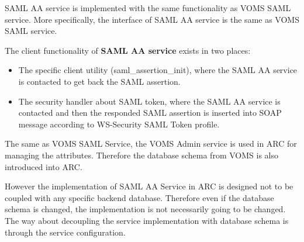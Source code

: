 \documentclass{article}                            %
\begin{document}
SAML AA service is implemented with the same functionality as VOMS SAML service. More specifically, the interface of SAML AA service is the same as VOMS SAML service. 

The client functionality of \textbf{SAML AA service} exists in two places:

\begin{itemize}
    \item The specific client utility (saml\_assertion\_init), where the SAML AA service is contacted to get back the SAML assertion.

    \item The security handler about SAML token, where the SAML AA service is contacted and then the responded SAML assertion is inserted into SOAP message according to WS-Security SAML Token profile.

\end{itemize}

The same as VOMS SAML Service, the VOMS Admin service is used in ARC for managing the attributes. Therefore the database schema from VOMS is also introduced into ARC.

However the implementation of SAML AA Service in ARC is designed not to be coupled with any specific backend database. Therefore even if the database schema is changed, the implementation is not necessarily going to be changed. The way about decoupling the service implementation with database schema is through the service configuration.
\end{document}
